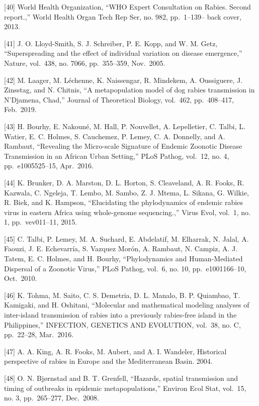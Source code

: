 \documentclass[
  oneside]{book}
\begin{document}
{[}40{]} World Health Organization, ``WHO Expert Consultation on Rabies. Second report.,'' World Health Organ Tech Rep Ser, no. 982, pp.~1--139-- back cover, 2013.

{[}41{]} J. O. Lloyd-Smith, S. J. Schreiber, P. E. Kopp, and W. M. Getz, ``Superspreading and the effect of individual variation on disease emergence,'' Nature, vol.~438, no. 7066, pp.~355--359, Nov.~2005.

{[}42{]} M. Laager, M. Léchenne, K. Naissengar, R. Mindekem, A. Oussiguere, J. Zinsstag, and N. Chitnis, ``A metapopulation model of dog rabies transmission in N'Djamena, Chad,'' Journal of Theoretical Biology, vol.~462, pp.~408--417, Feb.~2019.

{[}43{]} H. Bourhy, E. Nakouné, M. Hall, P. Nouvellet, A. Lepelletier, C. Talbi, L. Watier, E. C. Holmes, S. Cauchemez, P. Lemey, C. A. Donnelly, and A. Rambaut, ``Revealing the Micro-scale Signature of Endemic Zoonotic Disease Transmission in an African Urban Setting,'' PLoS Pathog, vol.~12, no. 4, pp.~e1005525--15, Apr.~2016.

{[}44{]} K. Brunker, D. A. Marston, D. L. Horton, S. Cleaveland, A. R. Fooks, R. Kazwala, C. Ngeleja, T. Lembo, M. Sambo, Z. J. Mtema, L. Sikana, G. Wilkie, R. Biek, and K. Hampson, ``Elucidating the phylodynamics of endemic rabies virus in eastern Africa using whole-genome sequencing.,'' Virus Evol, vol.~1, no. 1, pp.~vev011--11, 2015.

{[}45{]} C. Talbi, P. Lemey, M. A. Suchard, E. Abdelatif, M. Elharrak, N. Jalal, A. Faouzi, J. E. Echevarría, S. Vazquez Morón, A. Rambaut, N. Campiz, A. J. Tatem, E. C. Holmes, and H. Bourhy, ``Phylodynamics and Human-Mediated Dispersal of a Zoonotic Virus,'' PLoS Pathog, vol.~6, no. 10, pp.~e1001166--10, Oct.~2010.

{[}46{]} K. Tohma, M. Saito, C. S. Demetria, D. L. Manalo, B. P. Quiambao, T. Kamigaki, and H. Oshitani, ``Molecular and mathematical modeling analyses of inter-island transmission of rabies into a previously rabies-free island in the Philippines,'' INFECTION, GENETICS AND EVOLUTION, vol.~38, no. C, pp.~22--28, Mar.~2016.

{[}47{]} A. A. King, A. R. Fooks, M. Aubert, and A. I. Wandeler, Historical perspective of rabies in Europe and the Mediterranean Basin. 2004.

{[}48{]} O. N. Bjørnstad and B. T. Grenfell, ``Hazards, spatial transmission and timing of outbreaks in epidemic metapopulations,'' Environ Ecol Stat, vol.~15, no. 3, pp.~265--277, Dec.~2008.
\end{document}
